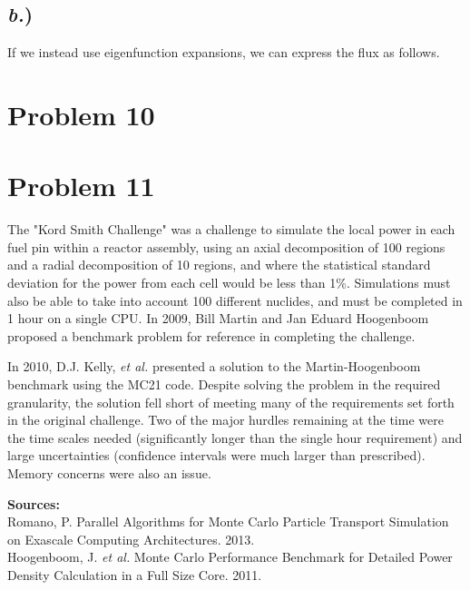 \documentclass{article}
\begin{document}
\subsection*{\textit{b.})}

If we instead use eigenfunction expansions, we can express the flux as follows.




\section*{Problem 10}





\section*{Problem 11}

The "Kord Smith Challenge" was a challenge to simulate the local power in each fuel pin within a reactor assembly, using an axial decomposition of 100 regions and a radial decomposition of 10 regions, and where the statistical standard deviation for the power from each cell would be less than 1\%. Simulations must also be able to take into account 100 different nuclides, and must be completed in 1 hour on a single CPU. In 2009, Bill Martin and Jan Eduard Hoogenboom proposed a benchmark problem for reference in completing the challenge. 

In 2010, D.J. Kelly, \textit{et al.} presented a solution to the Martin-Hoogenboom benchmark using the MC21 code. Despite solving the problem in the required granularity, the solution fell short of meeting many of the requirements set forth in the original challenge. Two of the major hurdles remaining at the time were the time scales needed (significantly longer than the single hour requirement) and large uncertainties (confidence intervals were much larger than prescribed). Memory concerns were also an issue.

\textbf{Sources:}\\
Romano, P. Parallel Algorithms for Monte Carlo Particle Transport Simulation on
Exascale Computing Architectures. 2013. \\
Hoogenboom, J. \textit{et al.} Monte Carlo Performance Benchmark for Detailed Power Density Calculation in a Full Size Core. 2011. \\



\end{document}
